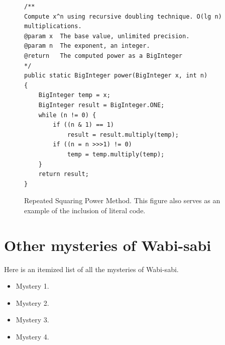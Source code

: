\documentclass[dissertation]{bsu-cs}  %
\begin{document}
\begin{figure}[t]

\begin{vcode}  
\begin{lstlisting}
/**
Compute x^n using recursive doubling technique. O(lg n) multiplications.
@param x  The base value, unlimited precision.
@param n  The exponent, an integer.
@return   The computed power as a BigInteger
*/
public static BigInteger power(BigInteger x, int n)
{
    BigInteger temp = x;
    BigInteger result = BigInteger.ONE;
	while (n != 0) {
        if ((n & 1) == 1) 
            result = result.multiply(temp);
		if ((n = n >>>1) != 0)
           	temp = temp.multiply(temp);
    }
    return result;
}
\end{lstlisting}
\end{vcode}
\caption[Repeated Squaring Power Method]{Repeated Squaring Power Method. This figure
also serves as an example of the inclusion of literal code.}
%
\label{fig:code} 
\end{figure}


\section{Other mysteries of Wabi-sabi}

Here is an itemized list of all the mysteries of Wabi-sabi.
\begin{itemize}
\item Mystery 1.
\item Mystery 2.
\item Mystery 3.
\item Mystery 4.
\end{itemize}

\end{document}
